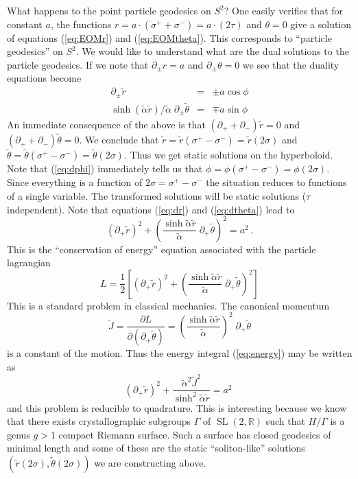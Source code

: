 \documentclass[a4paper,12pt]{article}
\DeclareMathOperator{\SL}{SL}
\newcommand{\alphatil}{\tilde{\alpha}}
\newcommand{\half}{\frac{1}{2}}
\newcommand{\bbR}{\mathbb{R}}
\newcommand{\rtil}{\tilde{r}}
\newcommand{\thetatil}{\tilde{\theta}}
\begin{document}
What happens to the point particle geodesics on $S^{2}$?  One easily
verifies that for constant $a$, the functions $r=a\cdot
(\sigma^{+}+\sigma^{-}) = a\cdot (2\tau)$ and $\theta=0$ give a
solution of equations (\ref{eq:EOMr}) and (\ref{eq:EOMtheta}).  This
corresponds to ``particle geodesics'' on $S^{2}$.  We would like to
understand what are the dual solutions to the particle geodesics.  If
we note that $\partial_{\pm}r = a$ and $\partial_{\pm}\theta=0$ we see
that the duality equations become
\begin{eqnarray}
    \partial_{\pm}\rtil & = & \pm a \cos\phi
    \label{eq:dr}  \\
    \sinh (\alphatil\rtil)/\alphatil\; \partial_{\pm}\thetatil& = & 
    	\mp a \sin\phi
    \label{eq:dtheta}
\end{eqnarray}
An immediate consequence of the above is that
$(\partial_{+}+\partial_{-})\rtil=0$ and
$(\partial_{+}+\partial_{-})\thetatil=0$.  We conclude that
$\rtil=\rtil(\sigma^{+}-\sigma^{-}) =\rtil(2\sigma)$ and
$\thetatil=\thetatil(\sigma^{+}-\sigma^{-}) =\thetatil(2\sigma)$. 
Thus we get static solutions on the hyperboloid.  Note that
(\ref{eq:dphi}) immediately tells us that
$\phi=\phi(\sigma^{+}-\sigma^{-}) =\phi(2\sigma)$.  Since everything
is a function of $2\sigma =\sigma^{+}-\sigma^{-}$ the situation
reduces to functions of a single variable.  The transformed solutions
will be static solutions ($\tau$ independent).  Note that equations
(\ref{eq:dr}) and (\ref{eq:dtheta}) lead to
\begin{equation}
    (\partial_{+}\rtil)^{2} + 
    \left(\frac{\sinh\alphatil\rtil}{\alphatil}\; 
    \partial_{+}\thetatil\right)^{2} = a^{2}\,.
    \label{eq:energy}
\end{equation}
This is the ``conservation of energy'' equation associated with the 
particle lagrangian
$$
	L = \half\left[ (\partial_{+}\rtil)^{2} + 
	\left(\frac{\sinh\alphatil\rtil}{\alphatil}\; 
	\partial_{+}\thetatil\right)^{2} \right]
$$
This is a standard problem in classical mechanics. The canonical 
momentum
$$
	\tilde{J} = \frac{\partial
	L}{\partial(\partial_{+}\thetatil)} =
	\left(\frac{\sinh\alphatil\rtil}{\alphatil} \right)^{2}\;
	\partial_{+}\thetatil
$$
is a constant of the motion. Thus the energy integral 
(\ref{eq:energy}) may be written as
\begin{equation}
    (\partial_{+}\rtil)^{2} +
    \frac{\alphatil^{2}\tilde{J}^{2}}{\sinh^{2}\alphatil\rtil} =
    a^{2}\;
\end{equation}
and this problem is reducible to quadrature.  This is interesting
because we know that there exists crystallographic subgroups $\Gamma$
of $\SL(2,\bbR)$ such that $H/\Gamma$ is a genus $g>1$ compact Riemann
surface.  Such a surface has closed geodesics of minimal length and
some of these are the static ``soliton-like'' solutions 
$(\rtil(2\sigma),\thetatil(2\sigma))$ we are
constructing above.
\end{document}
